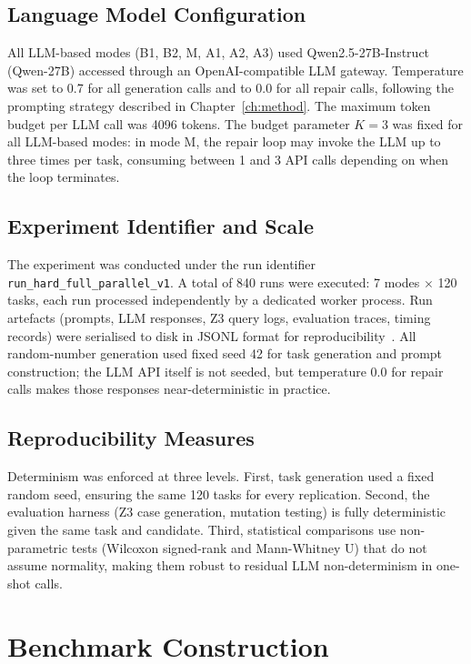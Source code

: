 \subsection{Language Model Configuration}

All LLM-based modes (B1, B2, M, A1, A2, A3) used Qwen2.5-27B-Instruct
(\textsf{Qwen-27B}) accessed through an OpenAI-compatible LLM gateway.  Temperature was set to 0.7 for all
generation calls and to 0.0 for all repair calls, following the prompting strategy
described in Chapter~\ref{ch:method}.  The maximum token budget per LLM call was
4096 tokens.  The budget parameter $K = 3$ was fixed for all LLM-based modes: in
mode M, the repair loop may invoke the LLM up to three times per task, consuming
between 1 and 3 API calls depending on when the loop terminates.

\subsection{Experiment Identifier and Scale}

The experiment was conducted under the run identifier
\texttt{run\_hard\_full\_parallel\_v1}.  A total of 840 runs were executed: 7 modes
$\times$ 120 tasks, each run processed independently by a dedicated worker process.
Run artefacts (prompts, LLM responses, Z3 query logs, evaluation traces, timing
records) were serialised to disk in JSONL format for reproducibility~\citep{ammann2016testing}.
All random-number generation used fixed seed 42 for task generation and prompt
construction; the LLM API itself is not seeded, but temperature 0.0 for repair
calls makes those responses near-deterministic in practice.

\subsection{Reproducibility Measures}

Determinism was enforced at three levels.  First, task generation used a fixed
random seed, ensuring the same 120 tasks for every replication.  Second, the
evaluation harness (Z3 case generation, mutation testing) is fully deterministic
given the same task and candidate.  Third, statistical comparisons use
non-parametric tests (Wilcoxon signed-rank and Mann-Whitney U) that do not assume
normality, making them robust to residual LLM non-determinism in one-shot calls.

\section{Benchmark Construction}
\label{sec:exp:benchmark}

